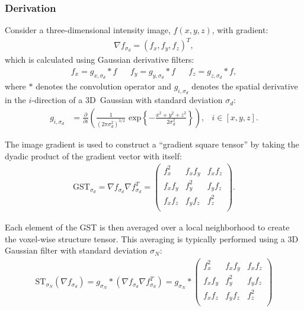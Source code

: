 \documentclass[11pt]{article}
\begin{document}
\subsubsection{Derivation}

Consider a three-dimensional intensity image, $f(x,y,z)$, with gradient:
\begin{align}
  \label{eq:grad}
  \nabla f_{\sigma_d} = {\left(f_x, f_y, f_z\right)}^T,
\end{align}
which is calculated using Gaussian derivative filters:
\begin{align}
  \label{eq:gradcomps}
  f_x = g_{x,\sigma_d} \ast f & &  f_y = g_{y,\sigma_d} \ast f & &  f_z = g_{z,\sigma_d} \ast f,
\end{align}
where $\ast$ denotes the convolution operator and $g_{i, \sigma_d}$ denotes the
spatial derivative in the $i$-direction of a 3D~Gaussian with
standard deviation $\sigma_d$:
\begin{align}
  \label{eq:gauss}
  g_{i,\sigma_d} &= \frac{\partial}{\partial i}\left(\frac{1}{\left(2\pi\sigma_d^2\right)^{3/2}}\text{ exp}\left\{-\frac{x^2 + y^2 + z^2}{2\sigma_d^2}\right\}\right), & i \in [x, y, z].
\end{align}

The image gradient is used to construct a ``gradient square tensor'' by taking
the dyadic product of the gradient vector with itself:
\begin{align}
  \label{eq:GST}
  \text{GST}_{\sigma_d} = \nabla f_{\sigma_d} \nabla f_{\sigma_d}^T =
  \begin{pmatrix}
    f_x^2 & f_x f_y & f_x f_z \\
    f_x f_y & f_y^2 & f_y f_z \\
    f_x f_z & f_y f_z & f_z^2 \\
  \end{pmatrix}.
\end{align}

Each element of the GST is then averaged over a local neighborhood to create the
voxel-wise structure tensor. This averaging is typically performed using a 3D
Gaussian filter with standard deviation $\sigma_N$:
\begin{align}
  \label{eq:ST}
  \text{ST}_{\sigma_N}\left(\nabla f_{\sigma_d}\right) = g_{\sigma_N} \ast
  \left(\nabla f_{\sigma_d} \nabla f_{\sigma_d}^T \right) = g_{\sigma_N} \ast
  \begin{pmatrix}
    f_x^2 & f_x f_y & f_x f_z \\
    f_x f_y & f_y^2 & f_y f_z \\
    f_x f_z & f_y f_z & f_z^2 \\
  \end{pmatrix}
\end{align}
\end{document}
